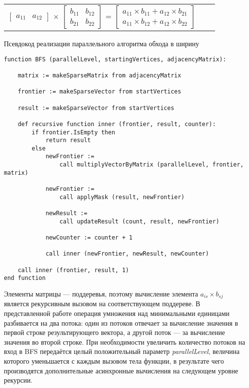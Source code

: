 \begin{center}
    \begin{tabular}{ccc}
        $\begin{bmatrix} a_{11} & a_{12} \end{bmatrix}$
        $\times$
        $\begin{bmatrix} b_{11} & b_{12} \\ b_{21} & b_{22} \end{bmatrix}$
        =
        $\begin{bmatrix} a_{11} \times b_{11} + a_{12} \times b_{21} \\ a_{11} \times b_{12} + a_{12} \times b_{22} \end{bmatrix}$
    \end{tabular}
\end{center}

\lstset{style=codelistingstyle}

\begin{algorithm}[ht]
\caption{Псевдокод реализации параллельного алгоритма обхода в ширину}
\label{alg:bfs_example}
\begin{lstlisting}[language=pseudoFSharp]
function BFS (parallelLevel, startingVertices, adjacencyMatrix):

    matrix := makeSparseMatrix from adjacencyMatrix
    
    frontier := makeSparseVector from startVertices
    
    result := makeSparseVector from startVertices

    def recursive function inner (frontier, result, counter):
        if frontier.IsEmpty then
            return result
        else
            newFrontier :=
                call multiplyVectorByMatrix (parallelLevel, frontier, matrix)
                
            newFrontier :=
                call applyMask (result, newFrontier)

            newResult :=
                call updateResult (count, result, newFrontier)

            newCounter := counter + 1
            
            call inner (newFrontier, newResult, newCounter)

    call inner (frontier, result, 1)
end function
\end{lstlisting}
\end{algorithm}

Элементы матрицы --- поддеревья, поэтому вычисление элемента $a_{is} \times b_{sj}$ является рекурсивным вызовом на соответствующем поддереве. В представленной работе операция умножения над минимальными единицами разбивается на два потока: один из потоков отвечает за вычисление значения в первой строке результирующего вектора, а другой поток --- за вычисление значения во второй строке. При необходимости увеличить количество потоков на вход в BFS передаётся целый положительный параметр \textit{parallelLevel}, величина которого уменьшается с каждым вызовом тела функции, в результате чего производятся дополнительные асинхронные вычисления на следующем уровне рекурсии.